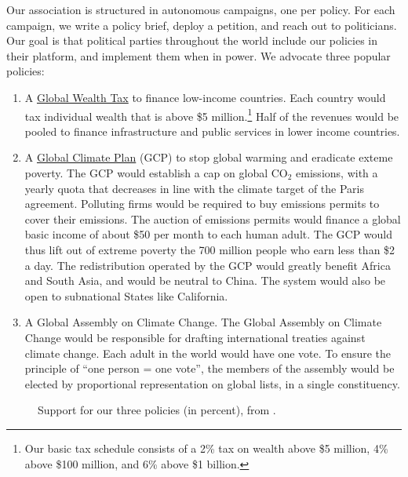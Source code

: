 \documentclass[12pt,english]{article}
\begin{document}
Our association is structured in autonomous campaigns, one per policy. For each campaign, we write a policy brief, deploy a petition, and reach out to politicians. Our goal is that political parties throughout the world include our policies in their platform, and implement them when in power. We advocate three popular policies:
\begin{enumerate}
  \item A \href{https://github.com/bixiou/global_tax_attitudes/raw/main/paper/policy_brief_tax.pdf}{Global Wealth Tax} to finance low-income countries. Each country would tax individual wealth that is above \$5 million.\footnote{Our basic tax schedule consists of a 2\% tax on wealth above \$5 million, 4\% above \$100 million, and 6\% above \$1 billion.} 
  Half of the revenues would be pooled to finance infrastructure and public services in lower income countries. 
  \item A \href{https://github.com/bixiou/global_tax_attitudes/raw/main/paper/policy_brief_GCP.pdf}{Global Climate Plan} (GCP) to stop global warming and eradicate exteme poverty. The GCP would establish a cap on global CO$_\text{2}$ emissions, with a yearly quota that decreases in line with the climate target of the Paris agreement. Polluting firms would be required to buy emissions permits to cover their emissions. The auction of emissions permits would finance a global basic income of about \$50 per month to each human adult. The GCP would thus lift out of extreme poverty the 700 million people who earn less than \$2 a day. The redistribution operated by the GCP would greatly benefit Africa and South Asia, and would be neutral to China. The system would also be open to subnational States like California. 
  \item A Global Assembly on Climate Change. The Global Assembly on Climate Change would be responsible for drafting international treaties against climate change. Each adult in the world would have one vote. To ensure the principle of ``one person = one vote'', the members of the assembly would be elected by proportional representation on global lists, in a single constituency.
\end{enumerate}

\begin{figure}[h!]
  \caption{Support for our three policies (in percent), from \citet{fabre_international_2023}.}\label{fig:GDPpc}
\end{figure}
\end{document}
